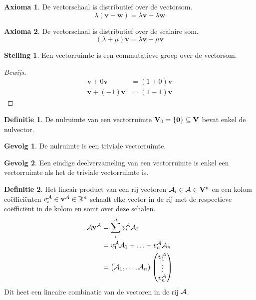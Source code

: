 \documentclass{amsart}
\theoremstyle{definition}
\newtheorem{axm}{Axioma}[section]
\newtheorem{thm}{Stelling}[section]
\newtheorem{dfn}{Definitie}[section]
\newtheorem{csq}{Gevolg}[section]
\newenvironment{bewijs}{\begin{proof}[Bewijs]}{\end{proof}}
\newcommand{\setsm}[1]{\{{#1}\}}
\newcommand{\vecspace}[1][v]{\mathrm{\mathbf{\MakeUppercase#1}}}
\newcommand{\vecspacen}[1][n]{\vecspace^#1}
\newcommand{\vvec}[1][v]{\mathbf{#1}}
\newcommand{\zerovec}{\vvec[0]}
\newcommand{\vecrow}[1][a]{\mathcal{\MakeUppercase{#1}}}
\newcommand{\rvec}[2][i]{{#2}_{#1}}
\newcommand{\rvecr}[2][i]{\rvec[#1]{\vecrow[#2]}}
\newcommand{\rveci}[1][i]{\rvecr[#1]{a}}
\newcommand{\cvec}[2]{{#1}^{#2}}
\newcommand{\cvecv}[2][v]{\cvec{\vvec[#1]}{#2}}
\newcommand{\cvecva}[1][a]{\cvecv{\vecrow[#1]}}
\newcommand{\vcord}[3]{{#1}_{#2}^{#3}}
\newcommand{\vcordv}[3][v]{\vcord{#1}{#2}{\vecrow[#3]}}
\newcommand{\vcordvi}[2][i]{\vcordv{#1}{#2}}
\newcommand{\vcordvia}[1][i]{\vcordvi[#1]{a}}
\begin{document}
\begin{axm}
	De vectorschaal is distributief over de vectorsom.
	\begin{equation*}
		\lambda(\vvec + \vvec[w]) = \lambda \vvec + \lambda \vvec[w]
	\end{equation*}
\end{axm}

\begin{axm}
	De vectorschaal is distributief over de scalaire som.
	\begin{equation*}
		(\lambda + \mu)\vvec = \lambda \vvec + \mu \vvec
	\end{equation*}
\end{axm}

\begin{thm}
	Een vectorruimte is een commutatieve groep over de vectorsom.
	\begin{bewijs}
		\begin{align*}
			\vvec + 0\vvec &= (1+0)\vvec \\
			\vvec + (-1)\vvec &= (1-1)\vvec
		\end{align*}
	\end{bewijs}
\end{thm}

\begin{dfn}
	De nulruimte van een vectorruimte $\vecspace_0 = \setsm\zerovec \subseteq \vecspace$ bevat enkel de nulvector.
\end{dfn}

\begin{csq}
	De nulruimte is een triviale vectorruimte.
\end{csq}

\begin{csq}
	Een eindige deelverzameling van een vectorruimte is enkel een vectorruimte als het de triviale vectorruimte is.
\end{csq}

\begin{dfn}
	Het lineair product van een rij vectoren $\rveci \in \vecrow \in \vecspacen$ en een kolom coëfficiënten $\vcordvia \in \cvecva \in \mathbb{R}^n$
	schaalt elke vector in de rij met de respectieve coëfficiënt in de kolom en somt over deze schalen.
	\begin{align*}
		\vecrow \cvecva &= \sum_i^n \vcordvia \rveci
		\\ & = \vcordvia[1] \rveci[1] + \ldots + \vcordvia[n] \rveci[n] 
		\\ & =
		\begin{pmatrix}
			\rveci[1], \ldots, \rveci[n]
		\end{pmatrix}
		\begin{pmatrix}
			\vcordvia[1] \\
			\vdots       \\
			\vcordvia[n]
		\end{pmatrix}
	\end{align*}
	Dit heet een lineaire combinatie van de vectoren in de rij $\vecrow$.
\end{dfn}
\end{document}
